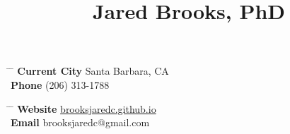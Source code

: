 \documentclass[10pt]{article} %
\begin{document}

\title{Jared Brooks, PhD} %


\parbox{0.5\textwidth}{ %
\begin{tabbing} %
\hspace{3cm} \= \hspace{4cm} \= \kill %
{\bf Current City} \> Santa Barbara, CA\\ %
{\bf Phone} \> (206) 313-1788 %
\end{tabbing}}
\hfill %
\parbox{0.5\textwidth}{ %
\begin{tabbing} %
\hspace{3cm} \= \hspace{4cm} \= \kill %
{\bf Website} \> \href{brooksjaredc.github.io}{brooksjaredc.github.io} \\ %
{\bf Email} \> brooksjaredc@gmail.com %
\end{tabbing}}
\end{document}
